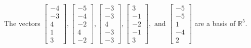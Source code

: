 \begin{exercise}
\begin{exerciseStatement}
  \end{exerciseStatement}
  \begin{exerciseAnswer}
   The vectors \(\left[\begin{array}{r}
-4 \\
-3 \\
4 \\
1 \\
3
\end{array}\right] , \left[\begin{array}{r}
-5 \\
-4 \\
-2 \\
4 \\
-2
\end{array}\right] , \left[\begin{array}{r}
-3 \\
-3 \\
4 \\
-3 \\
-3
\end{array}\right] , \left[\begin{array}{r}
3 \\
-1 \\
-2 \\
-1 \\
3
\end{array}\right] , \text{ and } \left[\begin{array}{r}
-5 \\
-5 \\
1 \\
-4 \\
2
\end{array}\right]\) 
  	 are  a basis of \(\mathbb{R}^5\).
  


  \end{exerciseAnswer}
\end{exercise}